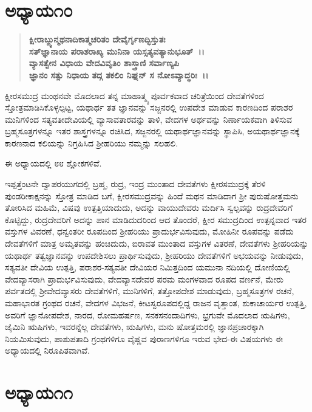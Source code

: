 \section*{ಅಧ್ಯಾಯ\enginline{-}೧೦}

\begin{verse}
\textbf{ಕ್ಷೀರಾಬ್ದ್ಯುನ್ಮಥನಾದಿಕಾತ್ಮಚರಿತಂ ದೇವೈರ್ಗೃಣದ್ಭಿಸ್ತುತಃ }\\\textbf{ಸತ್‌ಜ್ಞಾನಾಯ ಪರಾಶರಾಖ್ಯ ಮುನಿನಾ ಯಸ್ಸತ್ಯವತ್ಯಾನುಭೂತ್~।।} \\\textbf{ವ್ಯಾಸತ್ವೇನ ವಿಧಾಯ ವೇದವಿವೃತಿಂ ಶಾಸ್ತ್ರಾಣಿ ಸರ್ವಾಣ್ಯಪಿ}\\\textbf{ ಜ್ಞಾನಂ ಸತ್ಸು ನಿಧಾಯ ತದ್ಗ ತಕಲಿಂ ನಿಘ್ನನ್ ಸ ನೋಽವ್ಯಾದ್ಧರಿಃ~।।}
\end{verse}

\vskip -1pt

ಕ್ಷೀರಸಮುದ್ರ ಮಂಥನವೇ ಮೊದಲಾದ ತನ್ನ ಮಾಹಾತ್ಮ್ಯ ಪೂರ್ವಕವಾದ ಚರಿತ್ರೆಯಿಂದ ದೇವತೆಗಳಿಂದ ಸ್ತೋತ್ರಮಾಡಿಸಿಕೊಳ್ಳಲ್ಪಟ್ಟ, ಯಥಾರ್ಥ ತತ ಜ್ಞಾನವನ್ನು ಸಜ್ಜನರಲ್ಲಿ ಉಪದೇಶ ಮಾಡುವ ಕಾರಣದಿಂದ ಪರಾಶರ ಮುನಿಗಳಿಂದ ಸತ್ಯವತೀದೇವಿಯಲ್ಲಿ ವ್ಯಾಸಾವತಾರವನ್ನು ತಾಳಿ, ವೇದಗಳ ಅರ್ಥವನ್ನು ನಿರ್ಣಾಯಕವಾಗಿ ತಿಳಿಸುವ ಬ್ರಹ್ಮಸೂತ್ರಗಳನ್ನೂ ಇತರ ಶಾಸ್ತ್ರಗಳನ್ನೂ ರಚಿಸಿದ, ಸಜ್ಜನರಲ್ಲಿ ಯಥಾರ್ಥಜ್ಞಾನವನ್ನು ಸ್ಥಾಪಿಸಿ, ಅಯಥಾರ್ಥಜ್ಞಾನಕ್ಕೆ ಕಾರಣನಾದ ಕಲಿಯನ್ನು ನಿಗ್ರಹಿಸಿದ ಶ‍್ರೀಹರಿಯು ನಮ್ಮನ್ನು ಸಲಹಲಿ.

ಈ ಅಧ್ಯಾಯದಲ್ಲಿ ೮೮ ಶ್ಲೋಕಗಳಿವೆ.

ಇಪ್ಪತ್ತೆಂಟನೇ ದ್ವಾಪರಯುಗದಲ್ಲಿ ಬ್ರಹ್ಮ, ರುದ್ರ, ಇಂದ್ರ ಮುಂತಾದ ದೇವತೆಗಳು ಕ್ಷೀರಸಮುದ್ರಕ್ಕೆ ತೆರಳಿ ಪುಂಡರೀಕಾಕ್ಷನನ್ನು ಸ್ತೋತ್ರ ಮಾಡಿದ ಬಗೆ, ಕ್ಷೀರಸಮುದ್ರವನ್ನು ಹಿಂದೆ ಮಥನ ಮಾಡಿದಾಗ ಶ‍್ರೀ ಪುರುಷೋತ್ತಮನು ತೋರಿಸಿದ ಮಹಿಮೆ, ವಿಷವು ಉತ್ಪತ್ತಿ\-ಯಾದುದು, ಅದನ್ನು ವಾಯುದೇವರು ಮರ್ದಿಸಿ ಸ್ವಲ್ಪವನ್ನು ರುದ್ರದೇವರಿಗೆ ಕೊಟ್ಟಿದ್ದು, ರುದ್ರದೇವರಿಗೆ ಅದನ್ನು ಪಾನ ಮಾಡಿದುದರಿಂದ ಆದ ತೊಂದರೆ, ಕ್ಷೀರ ಸಮುದ್ರದಿಂದ ಉತ್ಪನ್ನವಾದ ಇತರ ವಸ್ತುಗಳ ವಿವರಣೆ, ಧನ್ವಂತರೀ ರೂಪದಿಂದ ಶ‍್ರೀಹರಿಯು ಪ್ರಾದುರ್ಭವಿಸುವುದು, ಮೋಹಿನೀ ರೂಪವನ್ನು ಪಡೆದು ದೇವತೆಗಳಿಗೆ ಮಾತ್ರ ಅಮೃತವನ್ನು ಹಂಚಿದುದು, ಐರಾವತ ಮುಂತಾದ ವಸ್ತುಗಳ ವಿತರಣೆ, ದೇವತೆಗಳು ಶ‍್ರೀಹರಿಯನ್ನು ಯಥಾರ್ಥ ತತ್ವಜ್ಞಾನವನ್ನು ಉಪದೇಶಿಸಲು ಪ್ರಾರ್ಥಿಸುವುದು, ಶ‍್ರೀಹರಿಯು ದೇವತೆಗಳಿಗೆ ಅಭಯವನ್ನು ನೀಡುವುದು, ಸತ್ಯವತೀ ದೇವಿಯ ಉತ್ಪತ್ತಿ, ಪರಾಶರ-ಸತ್ಯವತೀ ದೇವಿಯರ ನಿಮಿತ್ತದಿಂದ ಯಮುನಾ ನದಿಯಲ್ಲಿ ದೋಣಿಯಲ್ಲಿ ವೇದವ್ಯಾಸರಾಗಿ ಪ್ರಾದುರ್ಭವಿಸುವುದು, ವೇದವ್ಯಾಸದೇವರ ಪರಮ ಮಂಗಳವಾದ ರೂಪದ ವರ್ಣನೆ, ಮೇರು ಪರ್ವತದಲ್ಲಿ ಶ‍್ರೀವೇದವ್ಯಾಸರು ದೇವತೆಗಳಿಗೆ, ಮುನಿಗಳಿಗೆ, ತತ್ತೋಪದೇಶ ಮಾಡುವುದು, ಬ್ರಹ್ಮಸೂತ್ರಗಳ ರಚನೆ, ಮಹಾಭಾರತ ಗ್ರಂಥದ ರಚನೆ, ವೇದಗಳ ವಿಭಜನೆ, ಕೀಟಸ್ವರೂಪದಲ್ಲಿದ್ದ ರಾಜನ ವೃತ್ತಾಂತ, ಶುಕಾಚಾರ್ಯರ ಉತ್ಪತ್ತಿ, ಅವರಿಗೆ ಜ್ಞಾನೋಪದೇಶ, ನಾರದ, ರೋಮಹರ್ಷಣ, ಸನಕಸನಂದಾದಿಗಳು, ಭ್ರಗುವೇ ಮೊದಲಾದ ಋಷಿಗಳು, ಜೈಮಿನಿ ಋಷಿಗಳು, ಇವರನ್ನೆಲ್ಲ ದೇವತೆಗಳು, ಋಷಿಗಳು, ಮನು ಷೋತ್ತಮರಲ್ಲಿ ಜ್ಞಾನಪ್ರಚಾರಕ್ಕಾಗಿ ನಿಯಮಿಸುವುದು, ಪಾಶುಪತಾದಿ ಗ್ರಂಥಗಳಿಗೂ ವೈಷ್ಣವ ಪುರಾಣಗಳಿಗೂ ಇರುವ ಭೇದ-ಈ ವಿಷಯಗಳು ಈ ಅಧ್ಯಾಯದಲ್ಲಿ ನಿರೂಪಿತವಾಗಿವೆ.


\section*{ಅಧ್ಯಾಯ\enginline{-}೧೧}

